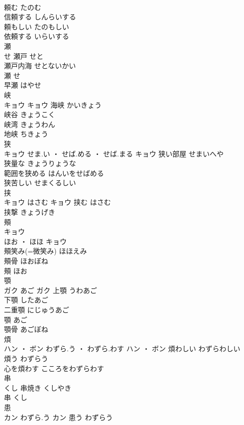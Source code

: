 \documentclass[8pt]{extreport}
\begin{document}
\begin{CJK}{UTF8}{min}
\\	頼む	たのむ	
\\	信頼する	しんらいする	
\\	頼もしい	たのもしい	
\\	依頼する	いらいする	
\\	瀬	
\\	せ		瀬戸	せと	
\\	瀬戸内海	せとないかい	
\\	瀬	せ	
\\	早瀬	はやせ	
\\	峡	
\\	キョウ		キョウ	海峡	かいきょう	
\\	峡谷	きょうこく	
\\	峡湾	きょうわん	
\\	地峡	ちきょう	
\\	狭	
\\	キョウ	せま.い ・ せば.める ・ せば.まる	キョウ	狭い部屋	せまいへや	
\\	狭量な	きょうりょうな	
\\	範囲を狭める	はんいをせばめる	
\\	狭苦しい	せまくるしい	
\\	挟	
\\	キョウ	はさむ	キョウ	挟む	はさむ	
\\	挟撃	きょうげき	
\\	頰	
\\	キョウ
\\	ほお ・ ほほ	キョウ
\\	頰笑み(=微笑み)	ほほえみ	
\\	頰骨	ほおぼね	
\\	頰	ほお	
\\	顎	
\\	ガク	あご	ガク	上顎	うわあご	
\\	下顎	したあご	
\\	二重顎	にじゅうあご	
\\	顎	あご	
\\	顎骨	あごぼね	
\\	煩	
\\	ハン ・ ボン	わずら.う ・ わずら.わす	ハン ・ ボン	煩わしい	わずらわしい	
\\	煩う	わずらう	
\\	心を煩わす	こころをわずらわす	
\\	串	
\\	くし		串焼き	くしやき	
\\	串	くし	
\\	患	
\\	カン	わずら.う	カン	患う	わずらう	

\end{CJK}
\end{document}
